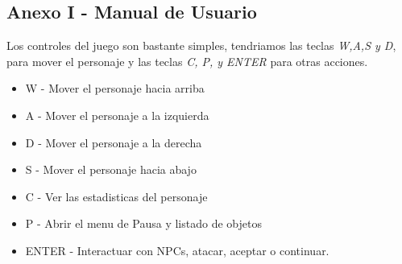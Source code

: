 \documentclass[a4paper]{article}
\begin{document}
\begin{appendices}
    \renewcommand{\thesection}{} %

    \section{Anexo I - Manual de Usuario}
    Los controles del juego son bastante simples, tendriamos las teclas \textit{W,A,S y D}, para mover el personaje y las teclas \textit{C, P, y ENTER} para otras acciones.
    \begin{itemize}
        \item W - Mover el personaje hacia arriba
        \item A - Mover el personaje a la izquierda
        \item D - Mover el personaje a la derecha
        \item S - Mover el personaje hacia abajo
        \item C - Ver las estadisticas del personaje
        \item P - Abrir el menu de Pausa y listado de objetos
        \item ENTER - Interactuar con NPCs, atacar, aceptar o continuar.
    \end{itemize}
    \clearpage


\end{appendices}
\end{document}
